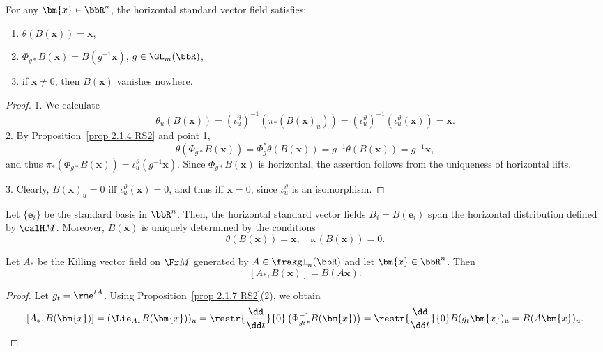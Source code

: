 \begin{prop}[{{\cite[Prop.~2.1.7]{RS2}}}]\label{prop 2.1.7 RS2}
    For any $\bm{x}\in\bbR^n$, the horizontal standard vector field satisfies:
    \begin{enumerate}
        \item $\theta(B(\bm{x}))=\bm{x}$,
        \item $\Phi_{g\ast}B(\bm{x})=B(g^{-1}\bm{x})$, $g\in\GL_m(\bbR)$,
        \item if $\bm{x}\neq 0$, then $B(\bm{x})$ vanishes nowhere.
    \end{enumerate}
\end{prop}
\begin{proof}
    1. We calculate
    \[\theta_u(B(\bm{x}))=(\iota_u^\vartheta)^{-1}(\pi_\ast(B(\bm{x})_u))=(\iota_u^\vartheta)^{-1}(\iota_u^\vartheta(\bm{x}))=\bm{x}.\]
    2. By Proposition~\ref{prop 2.1.4 RS2} and point 1, 
    \[\theta(\Phi_{g\ast}B(\bm{x}))=\Phi_g^\ast \theta(B(\bm{x}))=g^{-1}\theta(B(\bm{x}))=g^{-1}\bm{x},\]
    and thus $\pi_\ast(\Phi_{g\ast}B(\bm{x}))=\iota_u^\vartheta(g^{-1}\bm{x})$. Since $\Phi_{g\ast}B(\bm{x})$ is horizontal, the assertion follows from the uniqueness of horizontal lifts.

    3. Clearly, $B(\bm{x})_u=0$ iff $\iota_u^\vartheta(\bm{x})=0$, and thus iff $\bm{x}=0$, since $\iota_u^\vartheta$ is an isomorphism.
\end{proof}

\begin{rem}\label{rem 2.1.8 RS2}
    Let $\{\bm{e}_i\}$ be the standard basis in $\bbR^n$. Then, the horizontal standard vector fields $B_i=B(\bm{e}_i)$ span the horizontal distribution defined by $\calH M$. Moreover, $B(\bm{x})$ is uniquely determined by the conditions
    \[\theta(B(\bm{x}))=\bm{x},\quad \omega(B(\bm{x}))=0.\]
\end{rem}


\begin{lem}[{{\cite[Lem.~2.1.9]{RS2}}}]\label{lem 2.1.9 RS2}
    Let $A_\ast$ be the Killing vector field on $\Fr M$ generated by $A\in\frakgl_n(\bbR)$ and let $\bm{x}\in\bbR^n$. Then
    \[[A_\ast,B(\bm{x})]=B(A\bm{x}).\]
\end{lem}
\begin{proof}
    Let $g_t=\rme^{tA}$. Using Proposition~\ref{prop 2.1.7 RS2}(2), we obtain
    \[[A_\ast,B(\bm{x})]=(\Lie_{A_\ast}B(\bm{x}))_u=\restr{\frac{\dd}{\dd t}}{0}\left(\Phi_{g_t\ast}^{-1}B(\bm{x})\right)= \restr{\frac{\dd}{\dd t}}{0} B(g_t\bm{x})_u=B(A\bm{x})_u.\]
\end{proof}

